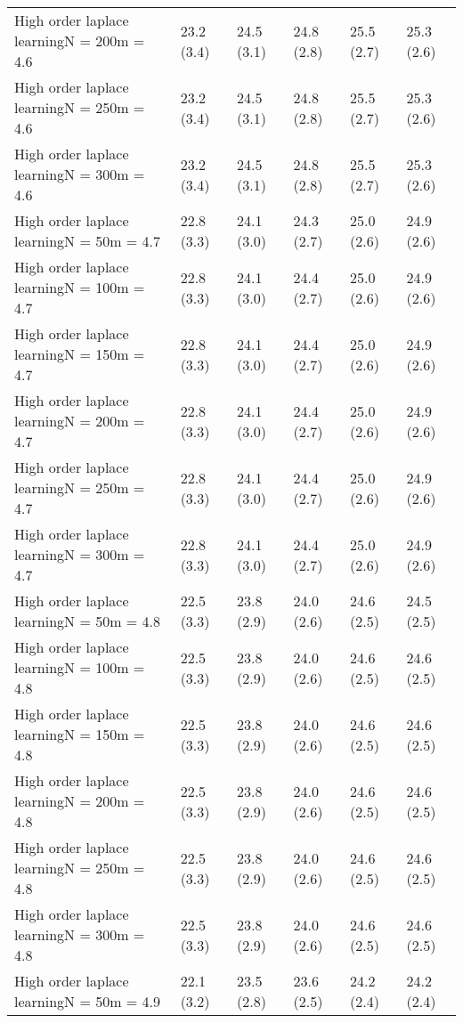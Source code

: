 \documentclass{article}
\begin{document}
\begin{table*}[t!]
\begin{center}
\begin{small}
\begin{sc}
\begin{tabular}{llllll}
High order laplace learningN = 200m = 4.6&23.2 (3.4)      &24.5 (3.1)      &24.8 (2.8)      &25.5 (2.7)      &25.3 (2.6)      \\
High order laplace learningN = 250m = 4.6&23.2 (3.4)      &24.5 (3.1)      &24.8 (2.8)      &25.5 (2.7)      &25.3 (2.6)      \\
High order laplace learningN = 300m = 4.6&23.2 (3.4)      &24.5 (3.1)      &24.8 (2.8)      &25.5 (2.7)      &25.3 (2.6)      \\
High order laplace learningN = 50m = 4.7&22.8 (3.3)      &24.1 (3.0)      &24.3 (2.7)      &25.0 (2.6)      &24.9 (2.6)      \\
High order laplace learningN = 100m = 4.7&22.8 (3.3)      &24.1 (3.0)      &24.4 (2.7)      &25.0 (2.6)      &24.9 (2.6)      \\
High order laplace learningN = 150m = 4.7&22.8 (3.3)      &24.1 (3.0)      &24.4 (2.7)      &25.0 (2.6)      &24.9 (2.6)      \\
High order laplace learningN = 200m = 4.7&22.8 (3.3)      &24.1 (3.0)      &24.4 (2.7)      &25.0 (2.6)      &24.9 (2.6)      \\
High order laplace learningN = 250m = 4.7&22.8 (3.3)      &24.1 (3.0)      &24.4 (2.7)      &25.0 (2.6)      &24.9 (2.6)      \\
High order laplace learningN = 300m = 4.7&22.8 (3.3)      &24.1 (3.0)      &24.4 (2.7)      &25.0 (2.6)      &24.9 (2.6)      \\
High order laplace learningN = 50m = 4.8&22.5 (3.3)      &23.8 (2.9)      &24.0 (2.6)      &24.6 (2.5)      &24.5 (2.5)      \\
High order laplace learningN = 100m = 4.8&22.5 (3.3)      &23.8 (2.9)      &24.0 (2.6)      &24.6 (2.5)      &24.6 (2.5)      \\
High order laplace learningN = 150m = 4.8&22.5 (3.3)      &23.8 (2.9)      &24.0 (2.6)      &24.6 (2.5)      &24.6 (2.5)      \\
High order laplace learningN = 200m = 4.8&22.5 (3.3)      &23.8 (2.9)      &24.0 (2.6)      &24.6 (2.5)      &24.6 (2.5)      \\
High order laplace learningN = 250m = 4.8&22.5 (3.3)      &23.8 (2.9)      &24.0 (2.6)      &24.6 (2.5)      &24.6 (2.5)      \\
High order laplace learningN = 300m = 4.8&22.5 (3.3)      &23.8 (2.9)      &24.0 (2.6)      &24.6 (2.5)      &24.6 (2.5)      \\
High order laplace learningN = 50m = 4.9&22.1 (3.2)      &23.5 (2.8)      &23.6 (2.5)      &24.2 (2.4)      &24.2 (2.4)      \\

\end{tabular}
\end{sc}
\end{small}
\end{center}
\end{table*}
\end{document}
